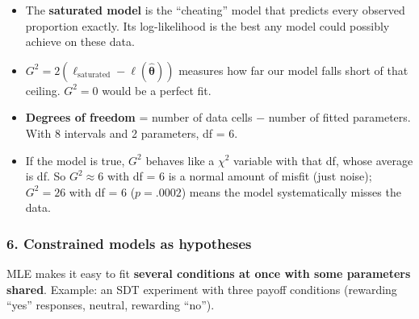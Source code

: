 \begin{itemize}
\tightlist
\item
  The \textbf{saturated model} is the ``cheating'' model that predicts
  every observed proportion exactly. Its log-likelihood is the best any
  model could possibly achieve on these data.
\item
  \(G^2 = 2(\ell_{\text{saturated}} - \ell(\hat{\boldsymbol\theta}))\)
  measures how far our model falls short of that ceiling. \(G^2 = 0\)
  would be a perfect fit.
\item
  \textbf{Degrees of freedom} = number of data cells − number of fitted
  parameters. With 8 intervals and 2 parameters, df = 6.
\item
  If the model is true, \(G^2\) behaves like a \(\chi^2\) variable with
  that df, whose average is df. So \(G^2 \approx 6\) with df = 6 is a
  normal amount of misfit (just noise); \(G^2 = 26\) with df = 6
  (\(p = .0002\)) means the model systematically misses the data.
\end{itemize}

\subsubsection{6. Constrained models as hypotheses}

MLE makes it easy to fit \textbf{several conditions at once with some
parameters shared}. Example: an SDT experiment with three payoff
conditions (rewarding ``yes'' responses, neutral, rewarding ``no'').

